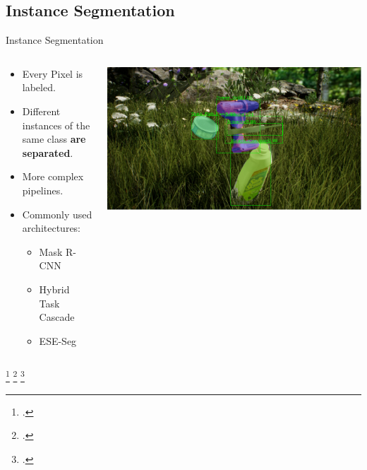 \documentclass[18pt]{beamer}
\begin{document}
\subsection{Instance Segmentation}
\begin{frame}{Instance Segmentation}
    \begin{columns}
        \begin{column}{0.5\textwidth}
           \begin{itemize}
               \item Every Pixel is labeled.
               \item Different instances of the same class \textbf{are separated}.
               \item More complex pipelines.
               \item Commonly used architectures:
               \begin{itemize}
                   \item Mask R-CNN~\footnotemark
                   \item Hybrid Task Cascade~\footnotemark
                   \item ESE-Seg~\footnotemark
               \end{itemize}
           \end{itemize}
        \end{column}
        \begin{column}{0.5\textwidth}
            \includegraphics[width=\textwidth]{figures/cmrcnn_mobilenet_fat.pdf}
        \end{column}
\end{columns}
\footcitetext{DBLP:journals/corr/HeGDG17}
\footcitetext{DBLP:journals/corr/abs-1901-07518}
\footcitetext{2019arXiv190804067X}
\end{frame}
\end{document}
